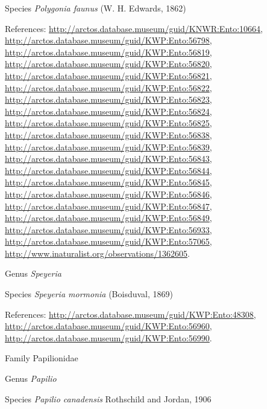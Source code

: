 \documentclass[9pt, article]{memoir}
\begin{document}
\begin{multicols}{2}
\vspace{6pt}\noindent\hspace{36pt}Species \textit{Polygonia faunus} (W. H. Edwards, 1862)


\vspace{6pt}References: 
\url{http://arctos.database.museum/guid/KNWR:Ento:10664}, 
\url{http://arctos.database.museum/guid/KWP:Ento:56798}, 
\url{http://arctos.database.museum/guid/KWP:Ento:56819}, 
\url{http://arctos.database.museum/guid/KWP:Ento:56820}, 
\url{http://arctos.database.museum/guid/KWP:Ento:56821}, 
\url{http://arctos.database.museum/guid/KWP:Ento:56822}, 
\url{http://arctos.database.museum/guid/KWP:Ento:56823}, 
\url{http://arctos.database.museum/guid/KWP:Ento:56824}, 
\url{http://arctos.database.museum/guid/KWP:Ento:56825}, 
\url{http://arctos.database.museum/guid/KWP:Ento:56838}, 
\url{http://arctos.database.museum/guid/KWP:Ento:56839}, 
\url{http://arctos.database.museum/guid/KWP:Ento:56843}, 
\url{http://arctos.database.museum/guid/KWP:Ento:56844}, 
\url{http://arctos.database.museum/guid/KWP:Ento:56845}, 
\url{http://arctos.database.museum/guid/KWP:Ento:56846}, 
\url{http://arctos.database.museum/guid/KWP:Ento:56847}, 
\url{http://arctos.database.museum/guid/KWP:Ento:56849}, 
\url{http://arctos.database.museum/guid/KWP:Ento:56933}, 
\url{http://arctos.database.museum/guid/KWP:Ento:57065}, 
\url{http://www.inaturalist.org/observations/1362605}.

\vspace{6pt}\noindent\hspace{30pt}Genus \textit{Speyeria}


\vspace{6pt}\noindent\hspace{36pt}Species \textit{Speyeria mormonia} (Boisduval, 1869)


\vspace{6pt}References: 
\url{http://arctos.database.museum/guid/KWP:Ento:48308}, 
\url{http://arctos.database.museum/guid/KWP:Ento:56960}, 
\url{http://arctos.database.museum/guid/KWP:Ento:56990}.

\vspace{6pt}\noindent\hspace{24pt}Family Papilionidae


\vspace{6pt}\noindent\hspace{30pt}Genus \textit{Papilio}


\vspace{6pt}\noindent\hspace{36pt}Species \textit{Papilio canadensis} Rothschild and Jordan, 1906



\end{multicols}
\end{document}
